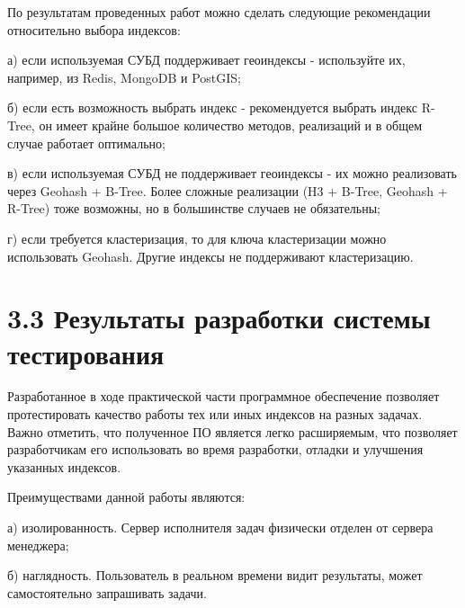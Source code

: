 По результатам проведенных работ можно сделать следующие рекомендации относительно выбора индексов:
\par а) если используемая СУБД поддерживает геоиндексы - используйте их, например, из Redis, MongoDB и PostGIS;
\par б) если есть возможность выбрать индекс - рекомендуется выбрать индекс R-Tree, он имеет крайне большое количество методов, реализаций и в общем случае работает оптимально;
\par в) если используемая СУБД не поддерживает геоиндексы - их можно реализовать через Geohash + B-Tree. Более сложные реализации (H3 + B-Tree, Geohash + R-Tree) тоже возможны, но в большинстве случаев не обязательны;
\par г) если требуется кластеризация, то для ключа кластеризации можно использовать Geohash. Другие индексы не поддерживают кластеризацию.

\section{3.3 Результаты разработки системы тестирования}
Разработанное в ходе практической части программное обеспечение позволяет протестировать качество работы тех или иных индексов на разных задачах. Важно отметить, что полученное ПО является легко расширяемым, что позволяет разработчикам его использовать во время разработки, отладки и улучшения указанных индексов.

Преимуществами данной работы являются:
\par а) изолированность. Сервер исполнителя задач физически отделен от сервера менеджера;
\par б) наглядность. Пользователь в реальном времени видит результаты, может самостоятельно запрашивать задачи. 